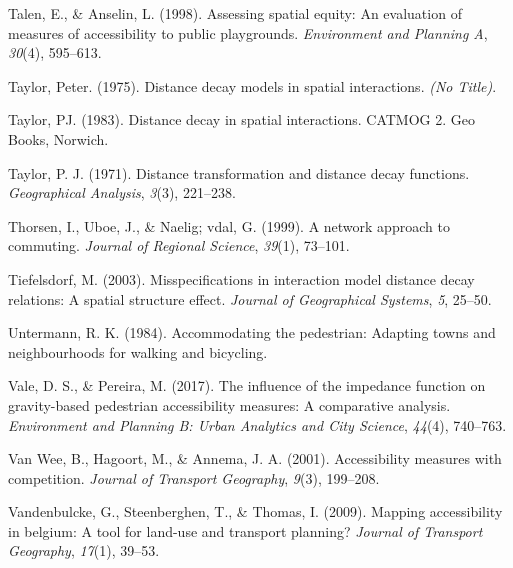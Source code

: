 \documentclass[
11pt, %
oneside, %
english, %
singlespacing, %
]{macthesis} %
\newlength{\cslhangindent}
\newenvironment{CSLReferences}[2] %
 {%
  \setlength{\parindent}{0pt}
  \ifodd #1 \everypar{\setlength{\hangindent}{\cslhangindent}}\ignorespaces\fi
  \ifnum #2 > 0
  \setlength{\parskip}{#2\baselineskip}
  \fi
 }%
 {}
\begin{document}
\begin{CSLReferences}{1}{0}
\leavevmode{}%
Talen, E., \& Anselin, L. (1998). Assessing spatial equity: An evaluation of measures of accessibility to public playgrounds. \emph{Environment and Planning A}, \emph{30}(4), 595--613.

\leavevmode{}%
Taylor, Peter. (1975). Distance decay models in spatial interactions. \emph{(No Title)}.

\leavevmode{}%
Taylor, PJ. (1983). Distance decay in spatial interactions. CATMOG 2. Geo Books, Norwich.

\leavevmode{}%
Taylor, P. J. (1971). Distance transformation and distance decay functions. \emph{Geographical Analysis}, \emph{3}(3), 221--238.

\leavevmode{}%
Thorsen, I., Uboe, J., \& Naelig; vdal, G. (1999). A network approach to commuting. \emph{Journal of Regional Science}, \emph{39}(1), 73--101.

\leavevmode{}%
Tiefelsdorf, M. (2003). Misspecifications in interaction model distance decay relations: A spatial structure effect. \emph{Journal of Geographical Systems}, \emph{5}, 25--50.

\leavevmode{}%
Untermann, R. K. (1984). Accommodating the pedestrian: Adapting towns and neighbourhoods for walking and bicycling.

\leavevmode{}%
Vale, D. S., \& Pereira, M. (2017). The influence of the impedance function on gravity-based pedestrian accessibility measures: A comparative analysis. \emph{Environment and Planning B: Urban Analytics and City Science}, \emph{44}(4), 740--763.

\leavevmode{}%
Van Wee, B., Hagoort, M., \& Annema, J. A. (2001). Accessibility measures with competition. \emph{Journal of Transport Geography}, \emph{9}(3), 199--208.

\leavevmode{}%
Vandenbulcke, G., Steenberghen, T., \& Thomas, I. (2009). Mapping accessibility in belgium: A tool for land-use and transport planning? \emph{Journal of Transport Geography}, \emph{17}(1), 39--53.


\end{CSLReferences}
\end{document}
